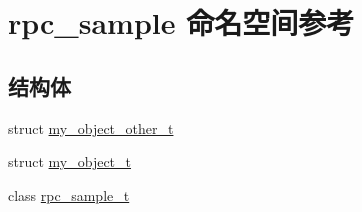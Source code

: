 \hypertarget{namespacerpc__sample}{}\section{rpc\+\_\+sample 命名空间参考}
\label{namespacerpc__sample}
\subsection*{结构体}
\begin{DoxyCompactItemize}
\item 
struct \hyperlink{structrpc__sample_1_1my__object__other__t}{my\+\_\+object\+\_\+other\+\_\+t}
\item 
struct \hyperlink{structrpc__sample_1_1my__object__t}{my\+\_\+object\+\_\+t}
\item 
class \hyperlink{classrpc__sample_1_1rpc__sample__t}{rpc\+\_\+sample\+\_\+t}
\end{DoxyCompactItemize}
